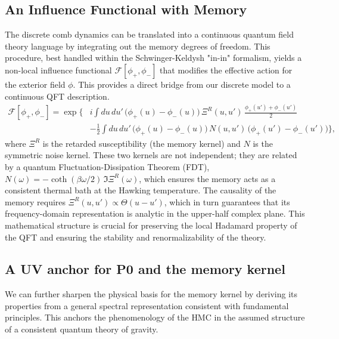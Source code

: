 \documentclass[a4paper,11pt]{article}
\newcommand{\HMC}{\textup{\textsc{HMC}}\xspace}
\theoremstyle{plain}
\theoremstyle{definition}
\theoremstyle{remark}
\begin{document}
\subsection{An Influence Functional with Memory}
\label{sec:influence}
The discrete comb dynamics can be translated into a continuous quantum field theory language by integrating out the memory degrees of freedom. This procedure, best handled within the Schwinger-Keldysh "in-in" formalism, yields a non-local influence functional $\mathcal{F}[\phi_+, \phi_-]$ that modifies the effective action for the exterior field $\phi$. This provides a direct bridge from our discrete model to a continuous QFT description.
\begin{align}
    \mathcal{F}[\phi_+, \phi_-]=\exp\Bigg\{ & i\!\int \!du\,du'\,\big(\phi_+(u)-\phi_-(u)\big)\,\Xi^R(u, u')\,\frac{\phi_+(u')+\phi_-(u')}{2} \nonumber \\
    & - \frac{1}{2}\!\int \!du\,du'\,\big(\phi_+(u)-\phi_-(u)\big)\,N(u,u')\,\big(\phi_+(u')-\phi_-(u')\big) \Bigg\},
    \label{eq:influence_functional}
\end{align}
where $\Xi^R$ is the retarded susceptibility (the memory kernel) and $N$ is the symmetric noise kernel. These two kernels are not independent; they are related by a quantum Fluctuation-Dissipation Theorem (FDT), $N(\omega)= - \coth(\beta \omega/2)\,\Im \Xi^R(\omega)$, which ensures the memory acts as a consistent thermal bath at the Hawking temperature. The causality of the memory requires $\Xi^R(u,u') \propto \Theta(u-u')$, which in turn guarantees that its frequency-domain representation is analytic in the upper-half complex plane. This mathematical structure is crucial for preserving the local Hadamard property of the QFT and ensuring the stability and renormalizability of the theory.

\subsection{A UV anchor for \texorpdfstring{P0}{P0} and the memory kernel}
\label{ssec:uv-anchor}
We can further sharpen the physical basis for the memory kernel by deriving its properties from a general spectral representation consistent with fundamental principles. This anchors the phenomenology of the \HMC{} in the assumed structure of a consistent quantum theory of gravity.
\end{document}
